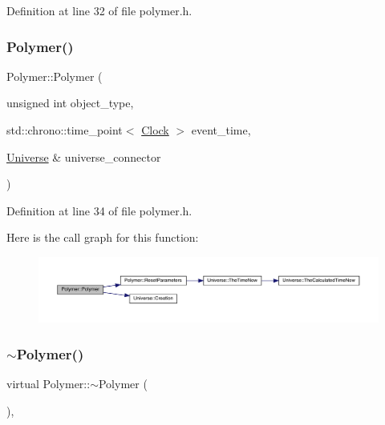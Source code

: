 Definition at line 32 of file polymer.\+h.

\mbox{\label{class_polymer_a53797e297c95b3bd934e1b8dd8c0c399}} 
\subsubsection{\texorpdfstring{Polymer()}{Polymer()}\hspace{0.1cm}{\footnotesize\ttfamily [13/14]}}
{\footnotesize\ttfamily Polymer\+::\+Polymer (\begin{DoxyParamCaption}\item[{unsigned int}]{object\+\_\+type,  }\item[{std\+::chrono\+::time\+\_\+point$<$ \mbox{\hyperlink{universe_8h_a0ef8d951d1ca5ab3cfaf7ab4c7a6fd80}{Clock}} $>$}]{event\+\_\+time,  }\item[{\mbox{\hyperlink{class_universe}{Universe}} \&}]{universe\+\_\+connector }\end{DoxyParamCaption})\hspace{0.3cm}{\ttfamily [inline]}}



Definition at line 34 of file polymer.\+h.

Here is the call graph for this function\+:\nopagebreak
\begin{figure}[H]
\begin{center}
\leavevmode
\includegraphics[width=350pt]{class_polymer_a53797e297c95b3bd934e1b8dd8c0c399_cgraph}
\end{center}
\end{figure}
\mbox{\label{class_polymer_aac2b3983f375a5691c7d5ca1a79594d5}} 
\subsubsection{\texorpdfstring{$\sim$\+Polymer()}{~Polymer()}\hspace{0.1cm}{\footnotesize\ttfamily [10/11]}}
{\footnotesize\ttfamily virtual Polymer\+::$\sim$\+Polymer (\begin{DoxyParamCaption}{ }\end{DoxyParamCaption})\hspace{0.3cm}{\ttfamily [inline]}, {\ttfamily [virtual]}}


